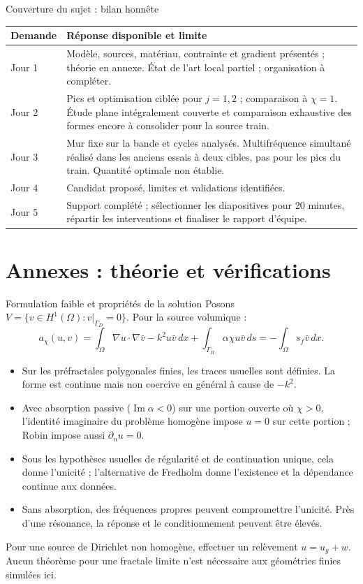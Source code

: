 \begin{frame}{Couverture du sujet : bilan honnête}
\small
\begin{tabular}{p{}p{}}
\toprule Demande & Réponse disponible et limite\\\midrule
Jour 1 & Modèle, sources, matériau, contrainte et gradient présentés ; théorie en annexe. État de l'art local partiel ; organisation à compléter.\\[1mm]
Jour 2 & Pics et optimisation ciblée pour $j=1,2$ ; comparaison à $\chi=1$. Étude plane intégralement couverte et comparaison exhaustive des formes encore à consolider pour la source train.\\[1mm]
Jour 3 & Mur fixe sur la bande et cycles analysés. Multifréquence simultané réalisé dans les anciens essais à deux cibles, pas pour les pics du train. Quantité optimale non établie.\\[1mm]
Jour 4 & Candidat proposé, limites et validations identifiées.\\[1mm]
Jour 5 & Support complété ; sélectionner les diapositives pour 20 minutes, répartir les interventions et finaliser le rapport d'équipe.\\\bottomrule
\end{tabular}
\end{frame}

\appendix
\section{Annexes : théorie et vérifications}

\begin{frame}{Formulation faible et propriétés de la solution}
\small Posons $V=\{v\in H^1(\Omega):v|_{\Gamma_D}=0\}$. Pour la source volumique :
\[
 a_\chi(u,v)=\int_\Omega \nabla u\cdot\nabla\bar v-k^2u\bar v\,dx
 +\int_{\Gamma_R}\alpha\chi u\bar v\,ds
 =-\int_\Omega s_f\bar v\,dx.
\]
\begin{itemize}
\item Sur les préfractales polygonales finies, les traces usuelles sont définies. La forme est continue mais non coercive en général à cause de $-k^2$.
\item Avec absorption passive ($\operatorname{Im}\alpha<0$) sur une portion ouverte où $\chi>0$, l'identité imaginaire du problème homogène impose $u=0$ sur cette portion ; Robin impose aussi $\partial_nu=0$.
\item Sous les hypothèses usuelles de régularité et de continuation unique, cela donne l'unicité ; l'alternative de Fredholm donne l'existence et la dépendance continue aux données.
\item Sans absorption, des fréquences propres peuvent compromettre l'unicité. Près d'une résonance, la réponse et le conditionnement peuvent être élevés.
\end{itemize}
\scriptsize Pour une source de Dirichlet non homogène, effectuer un relèvement $u=u_g+w$. Aucun théorème pour une fractale limite n'est nécessaire aux géométries finies simulées ici.
\end{frame}

